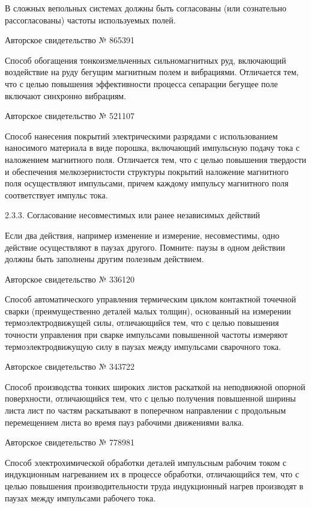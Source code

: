 В сложных вепольных системах  должны быть согласованы (или сознательно
рассогласованы) частоты используемых полей.


Авторское свидетельство № 865391

Способ  обогащения тонкоизмельченных  сильномагнитных руд,  включающий
воздействие на  руду бегущим магнитным полем  и вибрациями. Отличается
тем, что  с целью  повышения эффективности процесса  сепарации бегущее
поле включают синхронно вибрациям.


Авторское свидетельство № 521107

Способ  нанесения покрытий  электрическими разрядами  с использованием
наносимого материала в виде порошка, включающий импульсную подачу тока
с наложением  магнитного поля. Отличается  тем, что с  целью повышения
твердости и обеспечения  мелкозернистости структуры покрытий наложение
магнитного  поля  осуществляют  импульсами,  причем  каждому  импульсу
магнитного поля соответствует импульс тока.


2.3.3. Согласование несовместимых или ранее независимых действий

Если два действия, например  изменение и измерение, несовместимы, одно
действие  осуществляют  в  паузах  другого.  Помните:  паузы  в  одном
действии должны быть заполнены другим полезным действием.


Авторское свидетельство № 336120

Способ  автоматического   управления  термическим   циклом  контактной
точечной  сварки (преимущественно  деталей  малых толщин),  основанный
на  измерении  термоэлектродвижущей  силы,  отличающийся  тем,  что  с
целью повышения  точности управления при сварке  импульсами повышенной
частоты измеряют  термоэлектродвижущую силу в паузах  между импульсами
сварочного тока.


Авторское свидетельство № 343722

Способ  производства тонких  широких листов  раскаткой на  неподвижной
опорной  поверхности,   отличающийся  тем,   что  с   целью  получения
повышенной  ширины  листа  лист  по частям  раскатывают  в  поперечном
направлении  с продольным  перемещением листа  во время  пауз рабочими
движениями валка.


Авторское свидетельство № 778981

Способ электрохимической обработки деталей  импульсным рабочим током с
индукционным нагреванием  их в  процессе обработки,  отличающийся тем,
что  с целью  повышения производительности  труда индукционный  нагрев
производят в паузах между импульсами рабочего тока.


